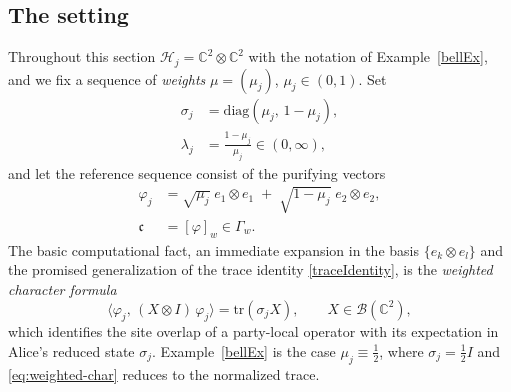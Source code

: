 \documentclass[twoside,11pt,letter]{article}
\def\bC{\mathbb{C}}
\def\cB{{\mathcal{B}}}
\def\cH{{\mathcal{H}}}
\def\fc{{\mathfrak{c}}}
\newcommand{\tr}{\mathrm{tr}}
\newcommand{\diag}{\mathrm{diag}}
\theoremstyle{definition}
\theoremstyle{definition}
\theoremstyle{plain}
\begin{document}
\subsection{The setting}
\label{sec:AW-setting}

Throughout this section $\cH_j = \bC^2 \otimes \bC^2$ with the notation of Example~\ref{bellEx}, and we fix a sequence of \emph{weights} $\mu = (\mu_j)$, $\mu_j \in (0,1)$. Set
\begin{equation}
\label{eq:sigma-j}
\begin{split}
\sigma_j &= \diag(\mu_j,\, 1 - \mu_j),\\
\lambda_j &= \frac{1 - \mu_j}{\mu_j} \in (0,\infty),
\end{split}
\end{equation}
and let the reference sequence consist of the purifying vectors
\begin{equation}
\label{eq:ref-mu}
\begin{split}
\varphi_j &= \sqrt{\mu_j}\; e_1 \otimes e_1 \;+\; \sqrt{1 - \mu_j}\;e_2 \otimes e_2,\\
\fc &= [\varphi]_w \in \Gamma_w .
\end{split}
\end{equation}
The basic computational fact, an immediate expansion in the basis $\{e_k \otimes e_l\}$ and the promised generalization of the trace identity \eqref{traceIdentity}, is the \emph{weighted character formula}
\begin{equation}
\label{eq:weighted-char}
\bigl\langle \varphi_j,\, (X \otimes I)\,\varphi_j \bigr\rangle
= \tr(\sigma_j X),
\qquad X \in \cB(\bC^2),
\end{equation}
which identifies the site overlap of a party-local operator with its expectation in Alice's reduced state $\sigma_j$. Example~\ref{bellEx} is the case $\mu_j \equiv \tfrac12$, where $\sigma_j = \tfrac12 I$ and \eqref{eq:weighted-char} reduces to the normalized trace.
\end{document}
